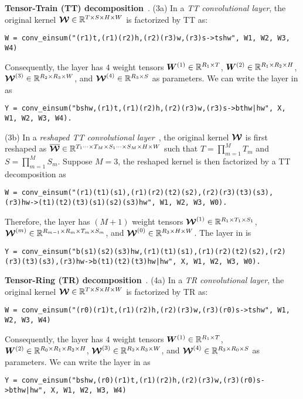 \textbf{Tensor-Train (TT) decomposition}~\citep{oseledets2011tensor}.
(3a) In a {\em TT convolutional layer}, the original kernel $\bm{\mathcal{W}} \in \mathbb{R}^{T \times S \times H \times W}$ is factorized by TT as:
\begin{lstlisting}
W = conv_einsum("(r1)t,(r1)(r2)h,(r2)(r3)w,(r3)s->tshw", W1, W2, W3, W4)
\end{lstlisting}
\vspace{-1em}
Consequently, the layer has $4$ weight tensors $\bm{W}^{(1)} \in \mathbb{R}^{R_1 \times T}$, $\bm{W}^{(2)} \in \mathbb{R}^{R_1 \times R_2 \times H}$, $\bm{\mathcal{W}}^{(3)} \in \mathbb{R}^{R_2 \times R_3 \times W}$, and $\bm{\mathcal{W}}^{(4)} \in \mathbb{R}^{R_3 \times S}$ as parameters. We can write the layer in \conveinsum as
\begin{lstlisting}
Y = conv_einsum("bshw,(r1)t,(r1)(r2)h,(r2)(r3)w,(r3)s->bthw|hw", X, W1, W2, W3, W4).
\end{lstlisting}
\vspace{-0.5em}

(3b) In a {\em reshaped TT convolutional layer}~\citep{garipov2016ultimate}, the original kernel $\bm{\mathcal{W}}$ is first reshaped as $\bm{\mathcal{\overline{W}}} \in \mathbb{R}^{T_1 \cdots \times T_M \times S_1 \cdots \times S_M \times H \times W}$ such that $T = \prod_{m = 1}^{M} T_m$ and $S = \prod_{m = 1}^{M} S_m$. Suppose $M = 3$, the reshaped kernel is then factorized by a TT decomposition as
\begin{lstlisting}
W = conv_einsum("(r1)(t1)(s1),(r1)(r2)(t2)(s2),(r2)(r3)(t3)(s3),(r3)hw->(t1)(t2)(t3)(s1)(s2)(s3)hw", W1, W2, W3, W0).
\end{lstlisting}
\vspace{-0.5em}
Therefore, the layer has $(M + 1)$ weight tensors $\bm{\mathcal{W}}^{(1)} \in \mathbb{R}^{R_1 \times T_1 \times S_1}$, $\bm{\mathcal{W}}^{(m)} \in \mathbb{R}^{R_{m - 1} \times R_m \times T_m \times S_m}$, and $\bm{\mathcal{W}}^{(0)} \in \mathbb{R}^{R_3 \times H \times W}$. The layer in \conveinsum is
\begin{lstlisting}
Y = conv_einsum("b(s1)(s2)(s3)hw,(r1)(t1)(s1),(r1)(r2)(t2)(s2),(r2)(r3)(t3)(s3),(r3)hw->b(t1)(t2)(t3)hw|hw", X, W1, W2, W3, W0).
\end{lstlisting}

\textbf{Tensor-Ring (TR) decomposition}~\citep{zhao2016tensor}.
(4a) In a {\em TR convolutional layer}, the original kernel $\bm{\mathcal{W}} \in \mathbb{R}^{T \times S \times H \times W}$ is factorized by TR as:
\begin{lstlisting}
W = conv_einsum("(r0)(r1)t,(r1)(r2)h,(r2)(r3)w,(r3)(r0)s->tshw", W1, W2, W3, W4)
\end{lstlisting}
\vspace{-1em}
Consequently, the layer has $4$ weight tensors $\bm{W}^{(1)} \in \mathbb{R}^{R_1 \times T}$, $\bm{W}^{(2)} \in \mathbb{R}^{R_0 \times R_1 \times R_2 \times H}$, $\bm{\mathcal{W}}^{(3)} \in \mathbb{R}^{R_2 \times R_3 \times W}$, and $\bm{\mathcal{W}}^{(4)} \in \mathbb{R}^{R_3 \times R_0 \times S}$ as parameters. We can write the layer in \conveinsum as
\begin{lstlisting}
Y = conv_einsum("bshw,(r0)(r1)t,(r1)(r2)h,(r2)(r3)w,(r3)(r0)s->bthw|hw", X, W1, W2, W3, W4)
\end{lstlisting}
\vspace{-0.5em}

